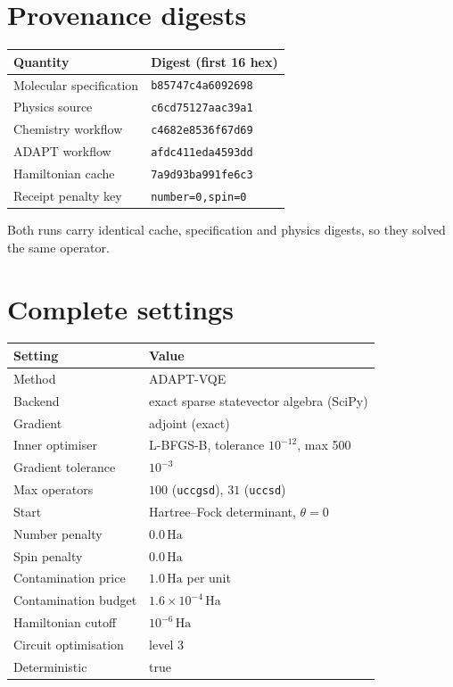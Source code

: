 \documentclass[11pt,a4paper]{article}
\newcommand{\Ha}{\ensuremath{\,\mathrm{Ha}}}
\newcommand{\code}[1]{\texttt{\small #1}}
\begin{document}
\appendix

\section{Provenance digests}

\begin{center}
\small
\begin{tabular}{ll}
\toprule
Quantity & Digest (first 16 hex) \\
\midrule
Molecular specification & \code{b85747c4a6092698} \\
Physics source          & \code{c6cd75127aac39a1} \\
Chemistry workflow      & \code{c4682e8536f67d69} \\
ADAPT workflow          & \code{afdc411eda4593dd} \\
Hamiltonian cache       & \code{7a9d93ba991fe6c3} \\
Receipt penalty key     & \code{number=0,spin=0} \\
\bottomrule
\end{tabular}
\end{center}

Both runs carry identical cache, specification and physics digests, so they
solved the same operator.

\section{Complete settings}

\begin{center}
\small
\begin{tabular}{ll}
\toprule
Setting & Value \\
\midrule
Method                  & ADAPT-VQE \\
Backend                 & exact sparse statevector algebra (SciPy) \\
Gradient                & adjoint (exact) \\
Inner optimiser         & L-BFGS-B, tolerance $10^{-12}$, max 500 \\
Gradient tolerance      & $10^{-3}$ \\
Max operators           & $100$ (\code{uccgsd}), $31$ (\code{uccsd}) \\
Start                   & Hartree--Fock determinant, $\theta = 0$ \\
Number penalty          & $0.0\Ha$ \\
Spin penalty            & $0.0\Ha$ \\
Contamination price     & $1.0\Ha$ per unit \\
Contamination budget    & $1.6\times10^{-4}\Ha$ \\
Hamiltonian cutoff      & $10^{-6}\Ha$ \\
Circuit optimisation    & level 3 \\
Deterministic           & true \\
\bottomrule
\end{tabular}
\end{center}
\end{document}
